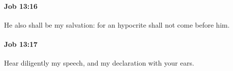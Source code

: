 		\paragraph{Job 13:16} %
			\label{JOB-13-16}

			He also shall be my salvation: for an hypocrite shall not come before him.


		\paragraph{Job 13:17} %
			\label{JOB-13-17}

			Hear diligently my speech, and my declaration with your ears.


